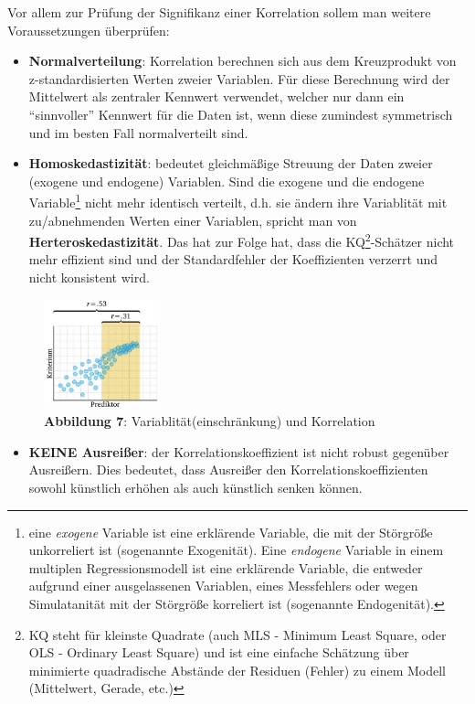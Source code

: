 \documentclass[
]{article}
\providecommand{\tightlist}{%
  \setlength{\itemsep}{0pt}\setlength{\parskip}{0pt}}
\begin{document}
Vor allem zur Prüfung der Signifikanz einer Korrelation sollem man weitere Voraussetzungen überprüfen:

\begin{itemize}
\item
  \textbf{Normalverteilung}: Korrelation berechnen sich aus dem Kreuzprodukt von z-standardisierten Werten zweier Variablen. Für diese Berechnung wird der Mittelwert als zentraler Kennwert verwendet, welcher nur dann ein ``sinnvoller'' Kennwert für die Daten ist, wenn diese zumindest symmetrisch und im besten Fall normalverteilt sind.
\item
  \textbf{Homoskedastizität}: bedeutet gleichmäßige Streuung der Daten zweier (exogene und endogene) Variablen. Sind die exogene und die endogene Variable\footnote{eine \emph{exogene} Variable ist eine erklärende Variable, die mit der Störgröße unkorreliert ist (sogenannte Exogenität). Eine \emph{endogene} Variable in einem multiplen Regressionsmodell ist eine erklärende Variable, die entweder aufgrund einer ausgelassenen Variablen, eines Messfehlers oder wegen Simulatanität mit der Störgröße korreliert ist (sogenannte Endogenität).} nicht mehr identisch verteilt, d.h. sie ändern ihre Variablität mit zu/abnehmenden Werten einer Variablen, spricht man von \textbf{Herteroskedastizität}. Das hat zur Folge hat, dass die KQ\footnote{KQ steht für kleinste Quadrate (auch MLS - Minimum Least Square, oder OLS - Ordinary Least Square) und ist eine einfache Schätzung über minimierte quadradische Abstände der Residuen (Fehler) zu einem Modell (Mittelwert, Gerade, etc.)}-Schätzer nicht mehr effizient sind und der Standardfehler der Koeffizienten verzerrt und nicht konsistent wird.
\end{itemize}

\begin{figure}
\centering
\includegraphics[width=0.3\textwidth,height=\textheight]{Images/Variabilitaet.JPG}
\caption{\textbf{Abbildung 7}: Variablität(einschränkung) und Korrelation}
\end{figure}

\begin{itemize}
\tightlist
\item
  \textbf{KEINE Ausreißer}: der Korrelationskoeffizient ist nicht robust gegenüber Ausreißern. Dies bedeutet, dass Ausreißer den Korrelationskoeffizienten sowohl künstlich erhöhen als auch künstlich senken können.
\end{itemize}
\end{document}

